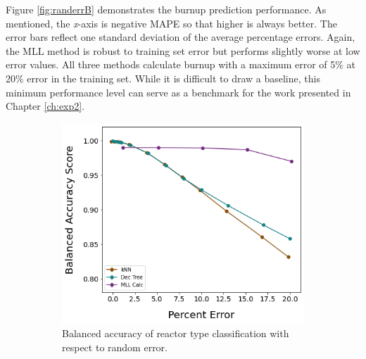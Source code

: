 Figure \ref{fig:randerrB} demonstrates the burnup prediction performance.  As
mentioned, the \textit{x}-axis is negative \gls{MAPE} so that higher is always
better.  The error bars reflect one standard deviation of the average
percentage errors.  Again, the \gls{MLL} method is robust to training set error
but performs slightly worse at low error values.  All three methods calculate
burnup with a maximum error of 5\% at 20\% error in the training set.  While it
is difficult to draw a baseline, this minimum performance level can serve as a
benchmark for the work presented in Chapter \ref{ch:exp2}. 

\begin{figure}[!hbt]
    \centering
    \begin{subfigure}[b]{0.49\textwidth}
        \centering
        \includegraphics[width=\textwidth]{./chapters/exp1/randerr_compare_nuc29_BalAcc_rxtr.png}
        \caption{Balanced accuracy of reactor type classification with respect 
                 to random error.}
        \label{fig:randerrA}
    \end{subfigure}
    \hfill
    \begin{subfigure}[b]{0.49\textwidth}
        \centering

\end{subfigure}
\end{figure}
